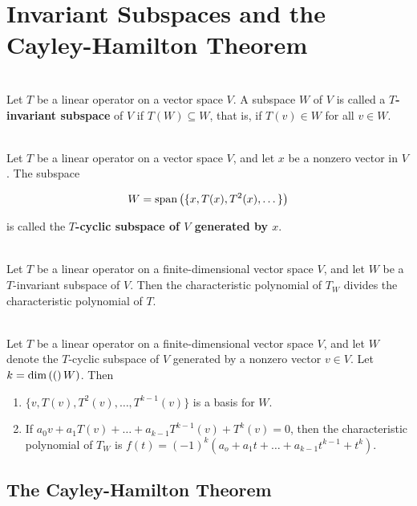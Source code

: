 \section{Invariant Subspaces and the Cayley-Hamilton Theorem}

\begin{definition}
	\hfill\\
	Let $T$ be a linear operator on a vector space $V$. A subspace $W$ of $V$ is called a \textbf{$T$-invariant subspace} of $V$ if $T(W) \subseteq W$, that is, if $T(v) \in W$ for all $v \in W$.
\end{definition}

\begin{definition}
	\hfill\\
	Let $T$ be a linear operator on a vector space $V$, and let $x$ be a nonzero vector in $V$. The subspace

	\[W = \text{span}\left(\{x, T(x), T^2(x), \dots\}\right)\]

	is called the \textbf{$T$-cyclic subspace of $V$ generated by $x$}.
\end{definition}

\begin{theorem}
	\hfill\\
	Let $T$ be a linear operator on a finite-dimensional vector space $V$, and let $W$ be a $T$-invariant subspace of $V$. Then the characteristic polynomial of $T_W$ divides the characteristic polynomial of $T$.
\end{theorem}

\begin{theorem}\label{Theorem 5.22}
	\hfill\\
	Let $T$ be a linear operator on a finite-dimensional vector space $V$, and let $W$ denote the $T$-cyclic subspace of $V$ generated by a nonzero vector $v \in V$. Let $k = \text{dim}\left((\right)W)$. Then

	\begin{enumerate}
		\item $\{v, T(v), T^2(v), \dots, T^{k-1}(v)\}$ is a basis for $W$.
		\item If $a_0v + a_1T(v) + \dots + a_{k-1}T^{k-1}(v)+T^k(v) = 0$, then the characteristic polynomial of $T_W$ is $f(t) = (-1)^k(a_o + a_1t + \dots +a_{k-1}t^{k-1}+t^k)$.
	\end{enumerate}
\end{theorem}

\subsection*{The Cayley-Hamilton Theorem}

